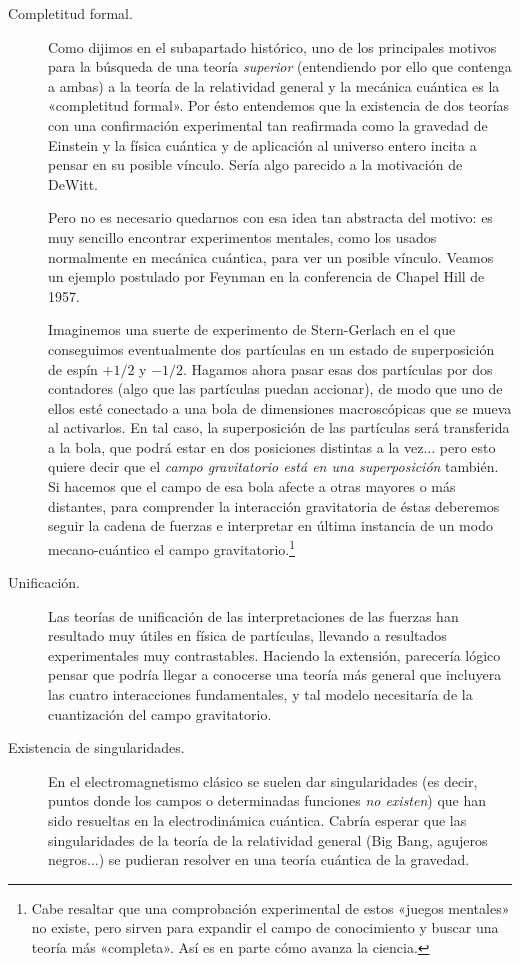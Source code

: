 \documentclass[11pt,a4paper,titlepage]{article}
\begin{document}
\begin{description}
  \item[Completitud formal.]{Como dijimos en el subapartado histórico, uno de los principales motivos para la búsqueda de una teoría \textit{superior} (entendiendo por ello que contenga a ambas) a la teoría de la relatividad general y la mecánica cuántica es la «completitud formal». Por ésto entendemos que la existencia de dos teorías con una confirmación experimental tan reafirmada como la gravedad de Einstein y la física cuántica y de aplicación al universo entero incita a pensar en su posible vínculo. Sería algo parecido a la motivación de DeWitt.
  \par Pero no es necesario quedarnos con esa idea tan abstracta del motivo: es muy sencillo encontrar experimentos mentales, como los usados normalmente en mecánica cuántica, para ver un posible vínculo. Veamos un ejemplo postulado por Feynman en la conferencia de Chapel Hill de 1957.
  \par Imaginemos una suerte de experimento de Stern-Gerlach en el que conseguimos eventualmente dos partículas en un estado de superposición de espín $+1/2$ y $-1/2$. Hagamos ahora pasar esas dos partículas por dos contadores (algo que las partículas puedan accionar), de modo que uno de ellos esté conectado a una bola de dimensiones macroscópicas que se mueva al activarlos. En tal caso, la superposición de las partículas será transferida a la bola, que podrá estar en dos posiciones distintas a la vez... pero esto quiere decir que el \textit{campo gravitatorio está en una superposición} también. Si hacemos que el campo de esa bola afecte a otras mayores o más distantes, para comprender la interacción gravitatoria de éstas deberemos seguir la cadena de fuerzas e interpretar en última instancia de un modo mecano-cuántico el campo gravitatorio.\footnote{Cabe resaltar que una comprobación experimental de estos «juegos mentales» no existe, pero sirven para expandir el campo de conocimiento y buscar una teoría más «completa». Así es en parte cómo avanza la ciencia.}}
  \item[Unificación.]{Las teorías de unificación de las interpretaciones de las fuerzas han resultado muy útiles en física de partículas, llevando a resultados experimentales muy contrastables. Haciendo la extensión, parecería lógico pensar que podría llegar a conocerse una teoría más general que incluyera las cuatro interacciones fundamentales, y tal modelo necesitaría de la cuantización del campo gravitatorio.}
  \item[Existencia de singularidades.]{En el electromagnetismo clásico se suelen dar singularidades (es decir, puntos donde los campos o determinadas funciones \textit{no existen}) que han sido resueltas en la electrodinámica cuántica. Cabría esperar que las singularidades de la teoría de la relatividad general (Big Bang, agujeros negros...) se pudieran resolver en una teoría cuántica de la gravedad.}

\end{description}
\end{document}
